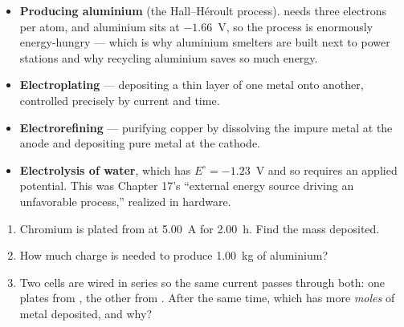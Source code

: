 \documentclass{apchem-notes}
\begin{document}


\begin{itemize}[leftmargin=*,itemsep=0.3em]
  \item \textbf{Producing aluminium} (the Hall--H\'eroult process).
         needs three electrons per atom, and aluminium sits at
        $-1.66$~V, so the process is enormously energy-hungry --- which is
        why aluminium smelters are built next to power stations and why
        recycling aluminium saves so much energy.
  \item \textbf{Electroplating} --- depositing a thin layer of one metal
        onto another, controlled precisely by current and time.
  \item \textbf{Electrorefining} --- purifying copper by dissolving the
        impure metal at the anode and depositing pure metal at the cathode.
  \item \textbf{Electrolysis of water}, which has
        $E^\circ = -1.23$~V and so requires an applied potential. This was
        Chapter 17's ``external energy source driving an unfavorable
        process,'' realized in hardware.
\end{itemize}


\begin{enumerate}[leftmargin=*,itemsep=0.4em]
  \item Chromium is plated from  at \SI{5.00}{\ampere} for
        \SI{2.00}{\hour}. Find the mass deposited. \workspace[2.8cm]
  \item How much charge is needed to produce \SI{1.00}{\kilo\gram} of
        aluminium? \workspace[2.6cm]
  \item Two cells are wired in series so the same current passes through
        both: one plates  from , the other  from
        . After the same time, which has more \emph{moles} of
        metal deposited, and why? 
\end{enumerate}
\end{document}

